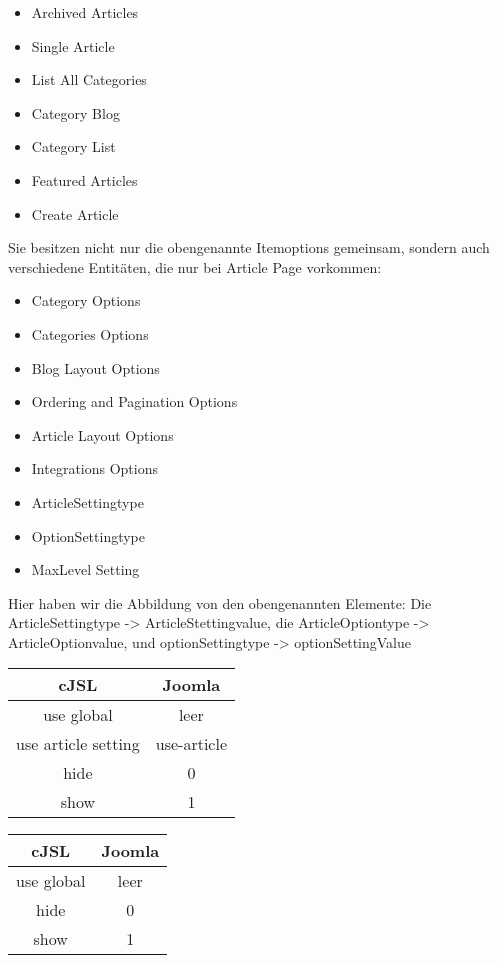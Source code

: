 \begin{itemize}
\item Archived Articles
\item Single Article
\item List All Categories
\item Category Blog
\item Category List
\item Featured Articles
\item Create Article
\end{itemize} 

Sie besitzen nicht nur die obengenannte Itemoptions gemeinsam, sondern auch verschiedene Entitäten, die nur bei Article Page vorkommen:

\begin{itemize}
\item Category Options
\item Categories Options
\item Blog Layout Options
\item Ordering and Pagination Options
\item Article Layout Options
\item Integrations Options
\item ArticleSettingtype
\item OptionSettingtype
\item MaxLevel Setting
\end{itemize}

Hier haben wir die Abbildung von den obengenannten Elemente: Die ArticleSettingtype -> ArticleStettingvalue, die ArticleOptiontype -> ArticleOptionvalue, und optionSettingtype -> optionSettingValue


\begin{minipage}{0.5\textwidth}
\begin{tabular}{|c|c|}
\hline
\textbf{cJSL} & \textbf{Joomla} \\ 
\hline
 use global & leer \\ 
 \hline
use article setting & use-article\\ 
\hline
hide & 0 \\ 
\hline
show & 1 \\ 
\hline
\end{tabular}
\end{minipage}
\begin{minipage}{0.5\textwidth}
\begin{tabular}{|c|c|}
\hline
\textbf{cJSL} & \textbf{Joomla} \\ 
\hline
use global & leer \\ 
\hline
hide & 0 \\ 
\hline
show & 1 \\  
\hline
\end{tabular}
\end{minipage}

